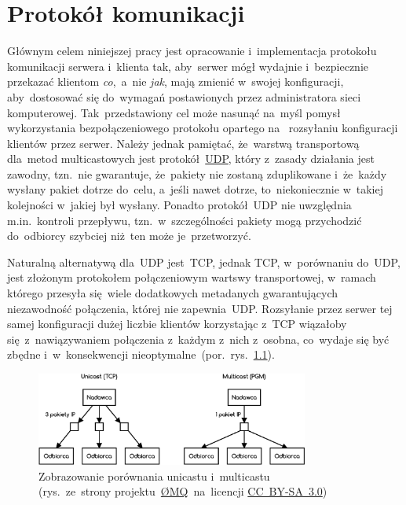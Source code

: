 \documentclass[thesis]{subfiles}
\begin{document}
\chapter{Protokół komunikacji}

Głównym celem niniejszej pracy jest opracowanie i~implementacja protokołu komunikacji serwera i~klienta tak, aby~serwer mógł wydajnie i~bezpiecznie przekazać klientom \emph{co},~a~nie \emph{jak}, mają zmienić w~swojej konfiguracji, aby~dostosować się do~wymagań postawionych przez administratora sieci komputerowej. Tak~przedstawiony cel może nasunąć na~myśl pomysł wykorzystania bezpołączeniowego protokołu opartego na~ rozsyłaniu konfiguracji klientów przez serwer. Należy jednak pamiętać, że~warstwą transportową dla~metod multicastowych jest protokół~\href{https://en.wikipedia.org/wiki/User_Datagram_Protocol}{UDP}, który z~zasady działania jest zawodny, tzn.~nie gwarantuje, że~pakiety nie zostaną zduplikowane i~że~każdy wysłany pakiet dotrze do~celu, a~jeśli nawet dotrze, to~niekoniecznie w~takiej kolejności w~jakiej był wysłany. Ponadto protokół~UDP nie uwzględnia m.in.~kontroli przepływu, tzn.~w~szczególności pakiety mogą przychodzić do~odbiorcy szybciej niż~ten może je~przetworzyć.

Naturalną alternatywą dla~UDP jest~TCP, jednak TCP, w~porównaniu do~UDP, jest złożonym protokołem połączeniowym wartswy transportowej, w~ramach którego przesyła się~wiele dodatkowych metadanych gwarantujących niezawodność połączenia, której nie zapewnia~UDP. Rozsyłanie przez serwer tej samej konfiguracji dużej liczbie klientów korzystając z~TCP wiązałoby się~z~nawiązywaniem połączenia z~każdym z~nich z~osobna, co~wydaje się być zbędne i~w~konsekwencji nieoptymalne~(por.~rys.~\ref{fig:unicast-vs-multicast}).

\begin{figure}
	\centering
	\includegraphics[width=0.8\textwidth]{img/unicast-vs-multicast}
	\caption{Zobrazowanie porównania unicastu i~multicastu\\(rys.~ze~strony projektu~\href{http://zeromq.org/}{ØMQ}~na~licencji  \href{https://creativecommons.org/licenses/by-sa/3.0/}{CC~BY-SA~3.0})}
	\label{fig:unicast-vs-multicast}
\end{figure}
\end{document}
